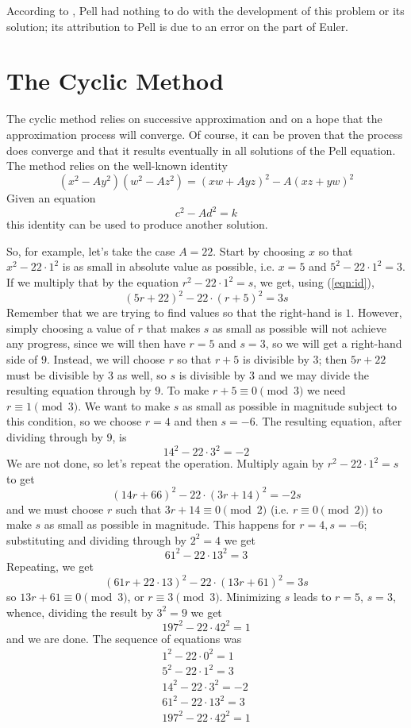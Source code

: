 \documentclass[12pt]{article}
\begin{document}
According to \cite{bib:edwards}, Pell had nothing to do with the development of this problem or its solution; its attribution to Pell is due to an error on the part of Euler.

\section*{The Cyclic Method}
The cyclic method relies on successive approximation and on a hope that the approximation process will converge. Of course, it can be proven that the process does converge and that it results eventually in all solutions of the Pell equation. The method relies on the well-known identity
\begin{equation}\label{eqn:id}(x^2-Ay^2)(w^2-Az^2)=(xw+Ayz)^2-A(xz+yw)^2\end{equation}
Given an equation
\[c^2-Ad^2=k\]
this identity can be used to produce another solution.

So, for example, let's take the case $A=22$. Start by choosing $x$ so that $x^2-22\cdot 1^2$ is as small in absolute value as possible, i.e. $x=5$ and $5^2-22\cdot 1^2=3$. If we multiply that by the equation $r^2-22\cdot 1^2=s$, we get, using (\ref{eqn:id}),
\[(5r+22)^2-22\cdot (r+5)^2=3s\]
Remember that we are trying to find values so that the right-hand  is $1$. However, simply choosing a value of $r$ that makes $s$ as small as possible will not achieve any progress, since we will then have $r=5$ and $s=3$, so we will get a right-hand side of $9$. Instead, we will choose $r$ so that $r+5$ is divisible by $3$; then $5r+22$ must be divisible by $3$ as well, so $s$ is divisible by $3$ and we may divide the resulting equation through by $9$. To make $r+5\equiv 0\pmod 3$ we need $r\equiv 1\pmod 3$. We want to make $s$ as small as possible in magnitude subject to this condition, so we choose $r=4$ and then $s=-6$. The resulting equation, after dividing through by $9$, is
\[14^2-22\cdot 3^2=-2\]
We are not done, so let's repeat the operation. Multiply again by $r^2-22\cdot 1^2=s$ to get
\[(14r+66)^2-22\cdot(3r+14)^2=-2s\]
and we must choose $r$ such that $3r+14\equiv 0\pmod 2$ (i.e. $r\equiv 0\pmod 2$) to make $s$ as small as possible in magnitude. This happens for $r=4, s=-6$; substituting and dividing through by $2^2=4$ we get
\[61^2-22\cdot 13^2=3\]
Repeating, we get
\[(61r+22\cdot 13)^2-22\cdot(13r+61)^2=3s\]
so $13r+61\equiv 0\pmod 3$, or $r\equiv 3\pmod 3$. Minimizing $s$ leads to $r=5$, $s=3$, whence, dividing the result by $3^2=9$ we get
\[197^2-22\cdot 42^2=1\]
and we are done. The sequence of equations was
\begin{gather*}
1^2-22\cdot 0^2= 1\\
5^2-22\cdot 1^2=3 \\
14^2-22\cdot 3^2=-2\\
61^2-22\cdot 13^2=3\\
197^2-22\cdot 42^2=1
\end{gather*}
\end{document}
